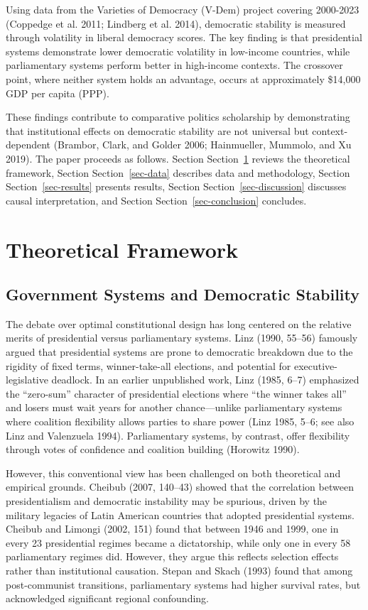 \documentclass[
  letterpaper,
  DIV=11,
  numbers=noendperiod]{scrartcl}
\begin{document}
Using data from the Varieties of Democracy (V-Dem) project covering
2000-2023 (Coppedge et al. 2011; Lindberg et al. 2014), democratic
stability is measured through volatility in liberal democracy scores.
The key finding is that presidential systems demonstrate lower
democratic volatility in low-income countries, while parliamentary
systems perform better in high-income contexts. The crossover point,
where neither system holds an advantage, occurs at approximately
\$14,000 GDP per capita (PPP).

These findings contribute to comparative politics scholarship by
demonstrating that institutional effects on democratic stability are not
universal but context-dependent (Brambor, Clark, and Golder 2006;
Hainmueller, Mummolo, and Xu 2019). The paper proceeds as follows.
Section Section~\ref{sec-theoretical-framework} reviews the theoretical
framework, Section Section~\ref{sec-data} describes data and
methodology, Section Section~\ref{sec-results} presents results, Section
Section~\ref{sec-discussion} discusses causal interpretation, and
Section Section~\ref{sec-conclusion} concludes.

\section{Theoretical Framework}\label{sec-theoretical-framework}

\subsection{Government Systems and Democratic
Stability}\label{government-systems-and-democratic-stability}

The debate over optimal constitutional design has long centered on the
relative merits of presidential versus parliamentary systems. Linz
(1990, 55--56) famously argued that presidential systems are prone to
democratic breakdown due to the rigidity of fixed terms, winner-take-all
elections, and potential for executive-legislative deadlock. In an
earlier unpublished work, Linz (1985, 6--7) emphasized the ``zero-sum''
character of presidential elections where ``the winner takes all'' and
losers must wait years for another chance---unlike parliamentary systems
where coalition flexibility allows parties to share power (Linz 1985,
5--6; see also Linz and Valenzuela 1994). Parliamentary systems, by
contrast, offer flexibility through votes of confidence and coalition
building (Horowitz 1990).

However, this conventional view has been challenged on both theoretical
and empirical grounds. Cheibub (2007, 140--43) showed that the
correlation between presidentialism and democratic instability may be
spurious, driven by the military legacies of Latin American countries
that adopted presidential systems. Cheibub and Limongi (2002, 151) found
that between 1946 and 1999, one in every 23 presidential regimes became
a dictatorship, while only one in every 58 parliamentary regimes did.
However, they argue this reflects selection effects rather than
institutional causation. Stepan and Skach (1993) found that among
post-communist transitions, parliamentary systems had higher survival
rates, but acknowledged significant regional confounding.
\end{document}
